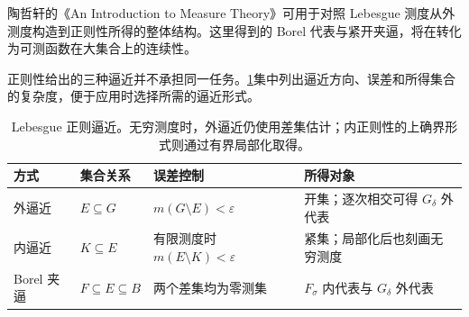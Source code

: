 \ProseParagraphBreak

陶哲轩的《An Introduction to Measure Theory》\cite{Tao2011Introduction}可用于对照 Lebesgue 测度从外测度构造到正则性所得的整体结构。这里得到的 Borel 代表与紧开夹逼，将在转化为可测函数在大集合上的连续性。

\ProseParagraphBreak

正则性给出的三种逼近并不承担同一任务。\cref{b1:tab:lebesgue-regular-approximations}集中列出逼近方向、误差和所得集合的复杂度，便于应用时选择所需的逼近形式。

\begin{table}[htbp]
\centering
\small
\renewcommand{\arraystretch}{1.16}
\begin{tabularx}{\linewidth}{@{}>{\raggedright\arraybackslash}p{6.2em} >{\raggedright\arraybackslash}p{11.5em} >{\raggedright\arraybackslash}p{12.5em} >{\raggedright\arraybackslash}X@{}}
\toprule
\textbf{方式} & \textbf{集合关系} & \textbf{误差控制} & \textbf{所得对象} \\
\midrule
外逼近 & \(E\subseteq G\) & \(m(G\setminus E)<\varepsilon\) & 开集；逐次相交可得 \(G_\delta\) 外代表 \\
内逼近 & \(K\subseteq E\) & 有限测度时 \(m(E\setminus K)<\varepsilon\) & 紧集；局部化后也刻画无穷测度 \\
Borel 夹逼 & \(F\subseteq E\subseteq B\) & 两个差集均为零测集 & \(F_\sigma\) 内代表与 \(G_\delta\) 外代表 \\
\bottomrule
\end{tabularx}
\caption[Lebesgue 正则逼近]{Lebesgue 正则逼近。无穷测度时，外逼近仍使用差集估计；内正则性的上确界形式则通过有界局部化取得。}
\label{b1:tab:lebesgue-regular-approximations}
\end{table}
